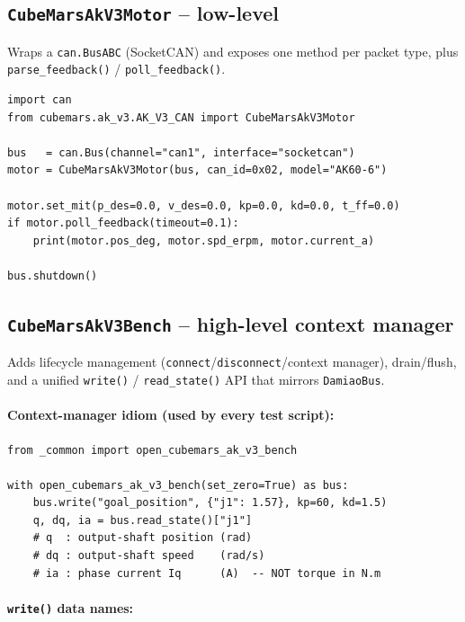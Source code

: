 \documentclass[11pt,a4paper]{article}
\begin{document}
\subsection{\texttt{CubeMarsAkV3Motor} -- low-level}

Wraps a \texttt{can.BusABC} (SocketCAN) and exposes one method per packet
type, plus \texttt{parse\_feedback()} / \texttt{poll\_feedback()}.

\begin{lstlisting}
import can
from cubemars.ak_v3.AK_V3_CAN import CubeMarsAkV3Motor

bus   = can.Bus(channel="can1", interface="socketcan")
motor = CubeMarsAkV3Motor(bus, can_id=0x02, model="AK60-6")

motor.set_mit(p_des=0.0, v_des=0.0, kp=0.0, kd=0.0, t_ff=0.0)
if motor.poll_feedback(timeout=0.1):
    print(motor.pos_deg, motor.spd_erpm, motor.current_a)

bus.shutdown()
\end{lstlisting}

\subsection{\texttt{CubeMarsAkV3Bench} -- high-level context manager}

Adds lifecycle management (\texttt{connect}/\texttt{disconnect}/context
manager), drain/flush, and a unified \texttt{write()} / \texttt{read\_state()}
API that mirrors \texttt{DamiaoBus}.

\paragraph{Context-manager idiom (used by every test script):}

\begin{lstlisting}
from _common import open_cubemars_ak_v3_bench

with open_cubemars_ak_v3_bench(set_zero=True) as bus:
    bus.write("goal_position", {"j1": 1.57}, kp=60, kd=1.5)
    q, dq, ia = bus.read_state()["j1"]
    # q  : output-shaft position (rad)
    # dq : output-shaft speed    (rad/s)
    # ia : phase current Iq      (A)  -- NOT torque in N.m
\end{lstlisting}

\paragraph{\texttt{write()} data names:}
\end{document}
